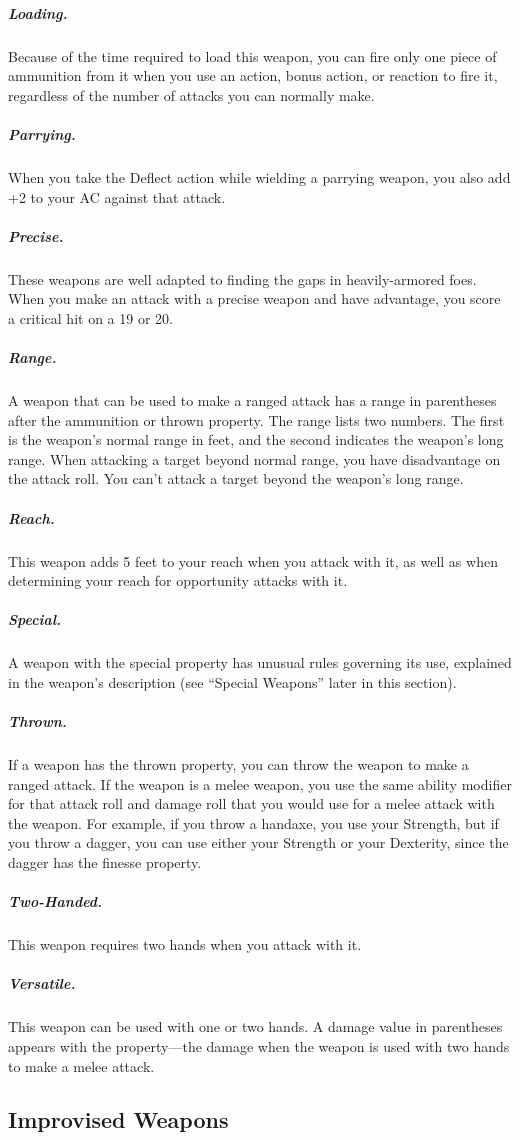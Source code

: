 \subparagraph*{Loading.} Because of the time required to load this weapon, you can fire only one piece of ammunition from it when you use an action, bonus action, or reaction to fire it, regardless of the number of attacks you can normally make.

\subparagraph*{Parrying.} When you take the Deflect action while wielding a parrying weapon, you also add +2 to your AC against that attack.

\subparagraph*{Precise.} These weapons are well adapted to finding the gaps in heavily-armored foes. When you make an attack with a precise weapon and have advantage, you score a critical hit on a 19 or 20.

\subparagraph*{Range.} A weapon that can be used to make a ranged attack has a range in parentheses after the ammunition or thrown property. The range lists two numbers. The first is the weapon's normal range in feet, and the second indicates the weapon's long range. When attacking a target beyond normal range, you have disadvantage on the attack roll. You can't attack a target beyond the weapon's long range.

\subparagraph*{Reach.} This weapon adds 5 feet to your reach when you attack with it, as well as when determining your reach for opportunity attacks with it.

\subparagraph*{Special.} A weapon with the special property has unusual rules governing its use, explained in the weapon's description (see “Special Weapons” later in this section).

\subparagraph*{Thrown.} If a weapon has the thrown property, you can throw the weapon to make a ranged attack. If the weapon is a melee weapon, you use the same ability modifier for that attack roll and damage roll that you would use for a melee attack with the weapon. For example, if you throw a handaxe, you use your Strength, but if you throw a dagger, you can use either your Strength or your Dexterity, since the dagger has the finesse property.

\subparagraph*{Two-Handed.} This weapon requires two hands when you attack with it.

\subparagraph*{Versatile.} This weapon can be used with one or two hands. A damage value in parentheses appears with the property—the damage when the weapon is used with two hands to make a melee attack.

\subsection{Improvised Weapons}

